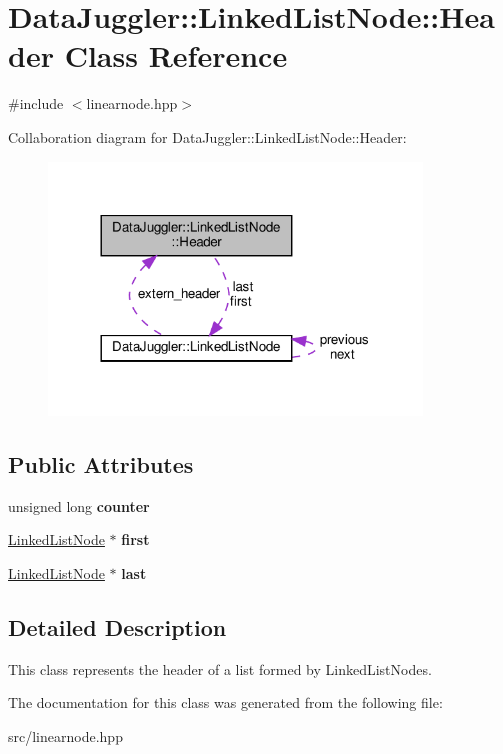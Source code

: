 \hypertarget{classDataJuggler_1_1LinkedListNode_1_1Header}{}\section{Data\+Juggler\+:\+:Linked\+List\+Node\+:\+:Header Class Reference}
\label{classDataJuggler_1_1LinkedListNode_1_1Header}


{\ttfamily \#include $<$linearnode.\+hpp$>$}



Collaboration diagram for Data\+Juggler\+:\+:Linked\+List\+Node\+:\+:Header\+:\nopagebreak
\begin{figure}[H]
\begin{center}
\leavevmode
\includegraphics[width=281pt]{classDataJuggler_1_1LinkedListNode_1_1Header__coll__graph}
\end{center}
\end{figure}
\subsection*{Public Attributes}
\begin{DoxyCompactItemize}
\item 
\mbox{\label{classDataJuggler_1_1LinkedListNode_1_1Header_a6d97ef022c673321ce13867e3c1d5b17}} 
unsigned long {\bfseries counter}
\item 
\mbox{\label{classDataJuggler_1_1LinkedListNode_1_1Header_abe505da1ec81b359371c0aa4631a01f2}} 
\hyperlink{classDataJuggler_1_1LinkedListNode}{Linked\+List\+Node} $\ast$ {\bfseries first}
\item 
\mbox{\label{classDataJuggler_1_1LinkedListNode_1_1Header_ad81659985a9776933338bc6f2b730e80}} 
\hyperlink{classDataJuggler_1_1LinkedListNode}{Linked\+List\+Node} $\ast$ {\bfseries last}
\end{DoxyCompactItemize}


\subsection{Detailed Description}
This class represents the header of a list formed by Linked\+List\+Nodes. 

The documentation for this class was generated from the following file\+:\begin{DoxyCompactItemize}
\item 
src/linearnode.\+hpp\end{DoxyCompactItemize}
